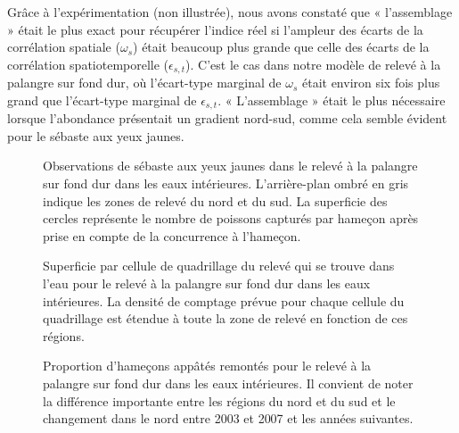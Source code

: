 \documentclass[french,11pt]{book}
\begin{document}
Grâce à l'expérimentation (non illustrée), nous avons constaté que « l'assemblage » était le plus exact pour récupérer l'indice réel si l'ampleur des écarts de la corrélation spatiale (\(\omega_s\)) était beaucoup plus grande que celle des écarts de la corrélation spatiotemporelle (\(\epsilon_{s,t}\)). C'est le cas dans notre modèle de relevé à la palangre sur fond dur, où l'écart-type marginal de \(\omega_s\) était environ six fois plus grand que l'écart-type marginal de \(\epsilon_{s,t}\). « L'assemblage » était le plus nécessaire lorsque l'abondance présentait un gradient nord-sud, comme cela semble évident pour le sébaste aux yeux jaunes.
\begin{figure}[htb]

{\centering {} 

}

\caption{Observations de sébaste aux yeux jaunes dans le relevé à la palangre sur fond dur dans les eaux intérieures. L’arrière-plan ombré en gris indique les zones de relevé du nord et du sud. La superficie des cercles représente le nombre de poissons capturés par hameçon après prise en compte de la concurrence à l’hameçon.}\label{fig:hbll-raw}
\end{figure}
\begin{figure}[htb]

{\centering {} 

}

\caption{Superficie par cellule de quadrillage du relevé qui se trouve dans l’eau pour le relevé à la palangre sur fond dur dans les eaux intérieures. La densité de comptage prévue pour chaque cellule du quadrillage est étendue à toute la zone de relevé en fonction de ces régions.}\label{fig:hbll-area-grid}
\end{figure}
\begin{figure}[htb]

{\centering {} 

}

\caption{Proportion d’hameçons appâtés remontés pour le relevé à la palangre sur fond dur dans les eaux intérieures. Il convient de noter la différence importante entre les régions du nord et du sud et le changement dans le nord entre 2003 et 2007 et les années suivantes.}\label{fig:hbll-baited}
\end{figure}
\end{document}
